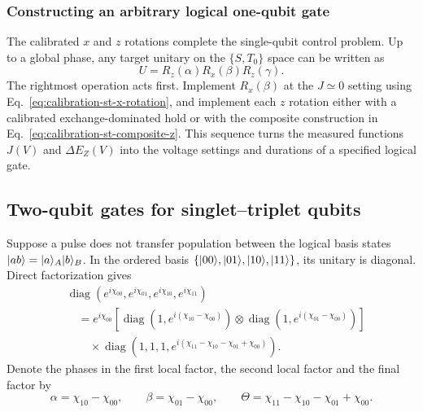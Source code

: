 \subsubsection{Constructing an arbitrary logical one-qubit gate}

The calibrated $x$ and $z$ rotations complete the single-qubit
control problem. Up to a global phase, any target unitary on the
$\{S,T_0\}$ space can be written as
\begin{equation}
 U=R_z(\alpha)R_x(\beta)R_z(\gamma).
 \label{eq:calibration-st-euler-decomposition}
\end{equation}
The rightmost operation acts first. Implement $R_x(\beta)$ at the
$J\simeq0$ setting using Eq.~\eqref{eq:calibration-st-x-rotation},
and implement each $z$ rotation either with a calibrated
exchange-dominated hold or with the composite construction in
Eq.~\eqref{eq:calibration-st-composite-z}. This sequence turns the
measured functions $J(V)$ and $\Delta E_Z(V)$ into the voltage
settings and durations of a specified logical gate.

\subsection{Two-qubit gates for singlet--triplet qubits}
\label{sec:calibration-controlled-phase}

Suppose a pulse does not transfer population between the logical
basis states $\lvert ab\rangle=\lvert a\rangle_A\lvert b\rangle_B$. In the ordered basis
$\{\lvert 00\rangle,\lvert 01\rangle,\lvert 10\rangle,\lvert 11\rangle\}$, its unitary is
diagonal. Direct factorization gives
\begin{equation}
 \begin{aligned}
 &\operatorname{diag}\!\left(
   e^{i\chi_{00}},e^{i\chi_{01}},
   e^{i\chi_{10}},e^{i\chi_{11}}\right)\\
 &\quad=e^{i\chi_{00}}
 \left[
  \operatorname{diag}\!\left(1,e^{i(\chi_{10}-\chi_{00})}\right)
  \otimes
  \operatorname{diag}\!\left(1,e^{i(\chi_{01}-\chi_{00})}\right)
 \right]\\
 &\qquad\times
 \operatorname{diag}\!\left(
   1,1,1,e^{i(\chi_{11}-\chi_{10}-\chi_{01}+\chi_{00})}
  \right).
 \end{aligned}
 \label{eq:calibration-phase-factorization}
\end{equation}
Denote the phases in the first local factor, the second local
factor and the final factor by
\[
 \alpha=\chi_{10}-\chi_{00},\qquad
 \beta=\chi_{01}-\chi_{00},\qquad
 \Theta=\chi_{11}-\chi_{10}-\chi_{01}+\chi_{00}.
\]

